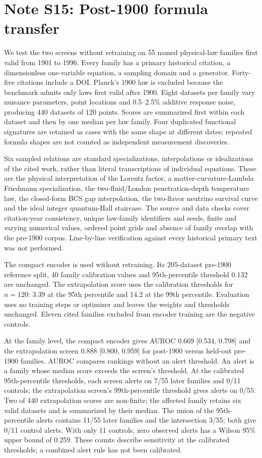 \documentclass{article}
\begin{document}
\section{Note S15: Post-1900 formula transfer}

We test the two screens without retraining on 55 named physical-law families first valid from 1901 to 1996. Every family has a primary historical citation, a dimensionless one-variable equation, a sampling domain and a generator. Forty-five citations include a DOI. Planck's 1900 law is excluded because the benchmark admits only laws first valid after 1900. Eight datasets per family vary nuisance parameters, point locations and 0.5--2.5\% additive response noise, producing 440 datasets of 120 points. Scores are summarized first within each dataset and then by one median per law family. Four duplicated functional signatures are retained as cases with the same shape at different dates; repeated formula shapes are not counted as independent measurement discoveries.

Six sampled relations are standard specializations, interpolations or idealizations of the cited work, rather than literal transcriptions of individual equations. These are the physical interpretation of the Lorentz factor, a matter-curvature-Lambda Friedmann specialization, the two-fluid/London penetration-depth temperature law, the closed-form BCS gap interpolation, the two-flavor neutrino survival curve and the ideal integer quantum-Hall staircase. The source and data checks cover citation-year consistency, unique law-family identifiers and seeds, finite and varying numerical values, ordered point grids and absence of family overlap with the pre-1900 corpus. Line-by-line verification against every historical primary text was not performed.

The compact encoder is used without retraining. Its 205-dataset pre-1900 reference split, 40 family calibration values and 95th-percentile threshold 0.132 are unchanged. The extrapolation score uses the calibration thresholds for $n = 120$: 3.39 at the 95th percentile and 14.2 at the 99th percentile. Evaluation uses no training steps or optimizer and leaves the weights and thresholds unchanged. Eleven cited families excluded from encoder training are the negative controls.

At the family level, the compact encoder gives AUROC 0.669 [0.534, 0.798] and the extrapolation screen 0.888 [0.800, 0.959] for post-1900 versus held-out pre-1900 families. AUROC compares rankings without an alert threshold. An alert is a family whose median score exceeds the screen's threshold. At the calibrated 95th-percentile thresholds, each screen alerts on 7/55 later families and 0/11 controls; the extrapolation screen's 99th-percentile threshold gives alerts on 0/55. Two of 440 extrapolation scores are non-finite; the affected family retains six valid datasets and is summarized by their median. The union of the 95th-percentile alerts contains 11/55 later families and the intersection 3/55; both give 0/11 control alerts. With only 11 controls, zero observed alerts has a Wilson 95\% upper bound of 0.259. These counts describe sensitivity at the calibrated thresholds; a combined alert rule has not been calibrated.
\end{document}
